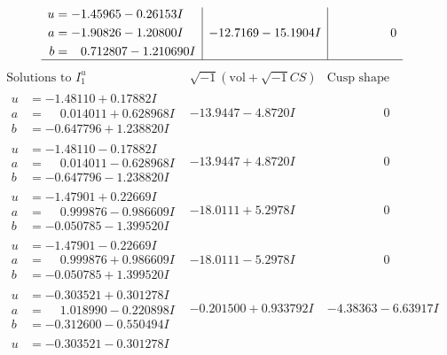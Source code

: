\documentclass[1p]{elsarticle_modified}
\theoremstyle{definition}
\newcommand{\I}{\sqrt{-1}}
\begin{document}
$$\begin{array}{c|c|c}
\begin{aligned}
u &= -1.45965 - 0.26153 I \\
a &= -1.90826 - 1.20800 I \\
b &= \phantom{-}0.712807 - 1.210690 I\end{aligned}
 & -12.7169 - 15.1904 I & \phantom{-0.000000 } 0\\
 \hline 
 \end{array}$$\newpage$$\begin{array}{c|c|c}  
\text{Solutions to }I^u_{1}& \I (\text{vol} + \sqrt{-1}CS) & \text{Cusp shape}\\
 \hline 
\begin{aligned}
u &= -1.48110 + 0.17882 I \\
a &= \phantom{-}0.014011 + 0.628968 I \\
b &= -0.647796 + 1.238820 I\end{aligned}
 & -13.9447 - 4.8720 I & \phantom{-0.000000 } 0 \\ \hline\begin{aligned}
u &= -1.48110 - 0.17882 I \\
a &= \phantom{-}0.014011 - 0.628968 I \\
b &= -0.647796 - 1.238820 I\end{aligned}
 & -13.9447 + 4.8720 I & \phantom{-0.000000 } 0 \\ \hline\begin{aligned}
u &= -1.47901 + 0.22669 I \\
a &= \phantom{-}0.999876 - 0.986609 I \\
b &= -0.050785 - 1.399520 I\end{aligned}
 & -18.0111 + 5.2978 I & \phantom{-0.000000 } 0 \\ \hline\begin{aligned}
u &= -1.47901 - 0.22669 I \\
a &= \phantom{-}0.999876 + 0.986609 I \\
b &= -0.050785 + 1.399520 I\end{aligned}
 & -18.0111 - 5.2978 I & \phantom{-0.000000 } 0 \\ \hline\begin{aligned}
u &= -0.303521 + 0.301278 I \\
a &= \phantom{-}1.018990 - 0.220898 I \\
b &= -0.312600 - 0.550494 I\end{aligned}
 & -0.201500 + 0.933792 I & -4.38363 - 6.63917 I \\ \hline\begin{aligned}
u &= -0.303521 - 0.301278 I \\

\end{aligned}
\end{array}$$
\end{document}
